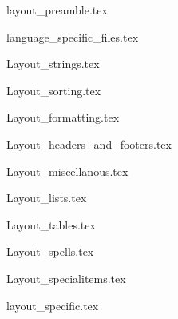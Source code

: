 
{layout_preamble.tex}


{language_specific_files.tex}



{Layout_strings.tex}



{Layout_sorting.tex}



{Layout_formatting.tex}



{Layout_headers_and_footers.tex}



{Layout_miscellanous.tex}



{Layout_lists.tex}



{Layout_tables.tex}



{Layout_spells.tex}



{Layout_specialitems.tex}



{layout_specific.tex}
